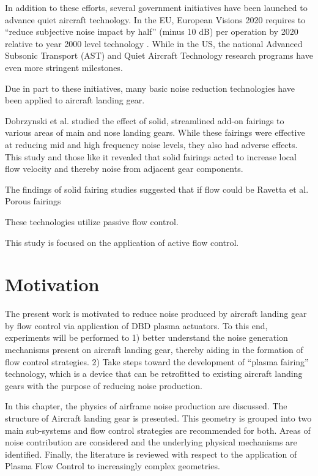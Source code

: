 In addition to these efforts, several government initiatives have been launched to advance quiet aircraft technology. In the EU, European Visions 2020 requires to ``reduce subjective noise impact by half'' (minus 10 dB) per operation by 2020 relative to year 2000 level technology \cite{dob}. While in the US, the national Advanced Subsonic Transport (AST) and Quiet Aircraft Technology research programs have even more stringent milestones.

Due in part to these initiatives, many basic noise reduction technologies have been applied to aircraft landing gear. 

Dobrzynski et al. studied the effect of solid, streamlined add-on fairings to various areas of main and nose landing gears. While these fairings were effective at reducing mid and high frequency noise levels, they also had adverse effects. This study and those like it revealed that solid fairings acted to increase local flow velocity and thereby noise from adjacent gear components.

The findings of solid fairing studies suggested that if flow could be 
Ravetta et al. Porous fairings

These technologies utilize passive flow control. 

This study is focused on the application of active flow control.

\section{Motivation}
The present work is motivated to reduce noise produced by aircraft landing gear by flow control via application of DBD plasma actuators. To this end, experiments will be performed to 
1) better understand the noise generation mechanisms present on aircraft landing gear, thereby aiding in the formation of flow control strategies.
2) Take steps toward the development of ``plasma fairing'' technology, which is a device that can be retrofitted to existing aircraft landing gears with the purpose of reducing noise production.


In this chapter, the physics of airframe noise production are discussed. The structure of Aircraft landing gear is presented. This geometry is grouped into two main sub-systems and flow control strategies are recommended for both. Areas of noise contribution are considered and the underlying physical mechanisms are identified. Finally, the literature is reviewed with respect to the application of Plasma Flow Control to increasingly complex geometries.

